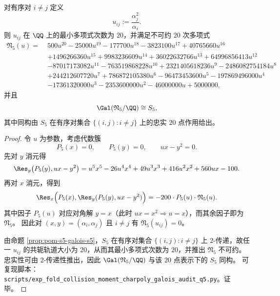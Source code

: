 \begin{proposition}\label{prop:pom-s5-ordered-ratio-degree20}
对有序对 \(i\neq j\) 定义
\[
u_{ij}:=\frac{\alpha_j^2}{\alpha_i}.
\]
则 \(u_{ij}\) 在 \(\QQ\) 上的最小多项式次数为 \(20\)，并满足不可约 \(20\) 次多项式
\[
\begin{aligned}
\mathfrak N_5(u)=\;&500u^{20}-25000u^{19}-177700u^{18}-3823100u^{17}+40765660u^{16}\\
&+1496266360u^{15}+9983236609u^{14}+36022632766u^{13}+64996856413u^{12}\\
&-87017173082u^{11}-763519868228u^{10}+2321405618236u^9-2486082754184u^8\\
&+244212607720u^7+786872105380u^6-96473453600u^5-197869496000u^4\\
&-17361320000u^3-2353600000u^2-46000000u+5000000,
\end{aligned}
\]
并且
\[
\Gal(\mathfrak N_5/\QQ)\cong S_5,
\]
其中同构由 \(S_5\) 在有序对集合 \(\{(i,j):i\neq j\}\) 上的忠实 \(20\) 点作用给出。
\end{proposition}
\begin{proof}
令 \(u\) 为参数，考虑代数簇
\[
P_5(x)=0,\qquad P_5(y)=0,\qquad ux-y^2=0.
\]
先对 \(y\) 消元得
\[
\Res_y\bigl(P_5(y),ux-y^2\bigr)=u^5x^5-26u^4x^4+49u^3x^3+416u^2x^2+560ux-100.
\]
再对 \(x\) 消元，得到
\[
\Res_x\Bigl(P_5(x),\Res_y(P_5(y),ux-y^2)\Bigr)
=-200\cdot P_5(u)\cdot \mathfrak N_5(u).
\]
其中因子 \(P_5(u)\) 对应对角解 \(y=x\)（此时 \(ux=x^2\Rightarrow u=x\)），而其余因子即为 \(\mathfrak N_5\)。
因此对 \((x,y)=(\alpha_i,\alpha_j)\) 且 \(i\neq j\) 有 \(\mathfrak N_5(u_{ij})=0\)。
\par
由命题 \ref{prop:pom-s5-galois-s5}，\(S_5\) 在有序对集合 \(\{(i,j):i\neq j\}\) 上 \(2\)-传递，故任一 \(u_{ij}\) 的共轭轨道大小为 \(20\)，从而其最小多项式次数为 \(20\)，并推出 \(\mathfrak N_5\) 不可约。
忠实性可由 \(2\)-传递性推出，因此 \(\Gal(\mathfrak N_5/\QQ)\) 与该 \(20\) 点表示下的 \(S_5\) 同构。
可复现脚本：\texttt{scripts/exp\_fold\_collision\_moment\_charpoly\_galois\_audit\_q5.py}。证毕。
\end{proof}

